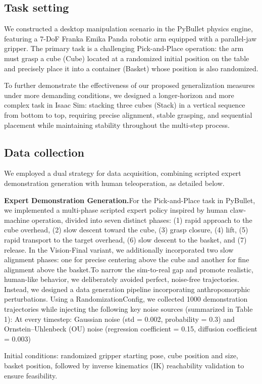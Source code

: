 \documentclass{article} %
\begin{document}
\subsection{Task setting}
We constructed a desktop manipulation scenario in the PyBullet physics engine, featuring a 7-DoF Franka Emika Panda robotic arm equipped with a parallel-jaw gripper. The primary task is a challenging Pick-and-Place operation: the arm must grasp a cube (Cube) located at a randomized initial position on the table and precisely place it into a container (Basket) whose position is also randomized.

To further demonstrate the effectiveness of our proposed generalization measures under more demanding conditions, we designed a longer-horizon and more complex task in Isaac Sim: stacking three cubes (Stack) in a vertical sequence from bottom to top, requiring precise alignment, stable grasping, and sequential placement while maintaining stability throughout the multi-step process.
\subsection{Data collection}
We employed a dual strategy for data acquisition, combining scripted expert demonstration generation with human teleoperation, as detailed below.

{\bf Expert Demonstration Generation.}For the Pick-and-Place task in PyBullet, we implemented a multi-phase scripted expert policy inspired by human claw-machine operation, divided into seven distinct phases: (1) rapid approach to the cube overhead, (2) slow descent toward the cube, (3) grasp closure, (4) lift, (5) rapid transport to the target overhead, (6) slow descent to the basket, and (7) release. In the Vision-Final variant, we additionally incorporated two slow alignment phases: one for precise centering above the cube and another for fine alignment above the basket.To narrow the sim-to-real gap and promote realistic, human-like behavior, we deliberately avoided perfect, noise-free trajectories. Instead, we designed a data generation pipeline incorporating anthropomorphic perturbations. Using a RandomizationConfig, we collected 1000 demonstration trajectories while injecting the following key noise sources (summarized in Table 1):
At every timestep: Gaussian noise (std = 0.002, probability = 0.3) and Ornstein–Uhlenbeck (OU) noise (regression coefficient = 0.15, diffusion coefficient = 0.003)

Initial conditions: randomized gripper starting pose, cube position and size, basket position, followed by inverse kinematics (IK) reachability validation to ensure feasibility.
\end{document}
